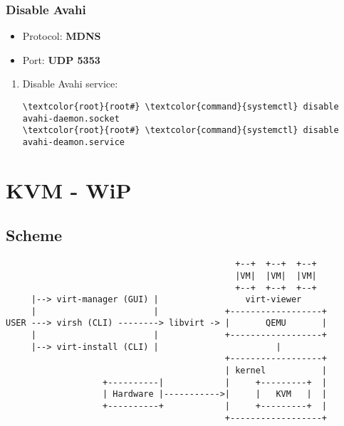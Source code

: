 \documentclass[10pt, a4paper, onecolumn, openany]{book} %
\begin{document}
\subsection{Disable Avahi}
\begin{itemize}
    \item Protocol: \textbf{MDNS}
    \item Port: \textbf{UDP 5353}
\end{itemize}
\begin{enumerate}
    \item Disable Avahi service:
\begin{Verbatim}[commandchars=\\\{\}]
\textcolor{root}{root#} \textcolor{command}{systemctl} disable avahi-daemon.socket
\textcolor{root}{root#} \textcolor{command}{systemctl} disable avahi-deamon.service
\end{Verbatim}
\end{enumerate}
\chapter{KVM - WiP}
\section{Scheme}
\begin{verbatim}
                                             +--+  +--+  +--+
                                             |VM|  |VM|  |VM|
                                             +--+  +--+  +--+
     |--> virt-manager (GUI) |                 virt-viewer
     |                       |             +------------------+
USER ---> virsh (CLI) --------> libvirt -> |       QEMU       |
     |                       |             +------------------+
     |--> virt-install (CLI) |                       |
                                           +------------------+
                                           | kernel           |
                   +----------|            |     +---------+  |
                   | Hardware |----------->|     |   KVM   |  |
                   +----------+            |     +---------+  |
                                           +------------------+
\end{verbatim}
\end{document}
